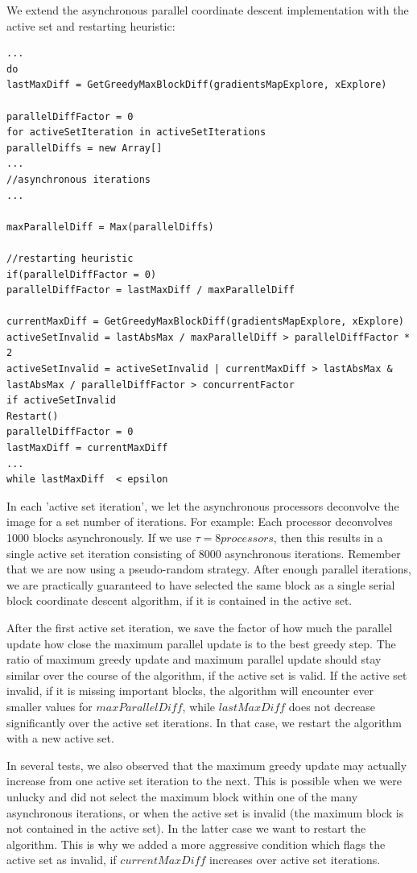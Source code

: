 We extend the asynchronous parallel coordinate descent implementation with the active set and restarting heuristic:
\begin{lstlisting}
...
do
lastMaxDiff = GetGreedyMaxBlockDiff(gradientsMapExplore, xExplore)

parallelDiffFactor = 0
for activeSetIteration in activeSetIterations
parallelDiffs = new Array[]
...
//asynchronous iterations
...

maxParallelDiff = Max(parallelDiffs)

//restarting heuristic
if(parallelDiffFactor = 0)
parallelDiffFactor = lastMaxDiff / maxParallelDiff

currentMaxDiff = GetGreedyMaxBlockDiff(gradientsMapExplore, xExplore)
activeSetInvalid = lastAbsMax / maxParallelDiff > parallelDiffFactor * 2
activeSetInvalid = activeSetInvalid | currentMaxDiff > lastAbsMax & lastAbsMax / parallelDiffFactor > concurrentFactor
if activeSetInvalid
Restart()
parallelDiffFactor = 0
lastMaxDiff = currentMaxDiff
...
while lastMaxDiff  < epsilon
\end{lstlisting}

In each 'active set iteration', we let the asynchronous processors deconvolve the image for a set number of iterations. For example: Each processor deconvolves 1000 blocks asynchronously. If we use $\tau = 8 processors$, then this results in a single active set iteration consisting of 8000 asynchronous iterations. Remember that we are now using a pseudo-random strategy. After enough parallel iterations, we are practically guaranteed to have selected the same block as a single serial block coordinate descent algorithm, if it is contained in the active set.

After the first active set iteration, we save the factor of how much the parallel update how close the maximum parallel update is to the best greedy step. The ratio of maximum greedy update and maximum parallel update should stay similar over the course of the algorithm, if the active set is valid. If the active set invalid, if it is missing important blocks, the algorithm will encounter ever smaller values for $maxParallelDiff$, while $lastMaxDiff$ does not decrease significantly over the active set iterations. In that case, we restart the algorithm with a new active set.

In several tests, we also observed that the maximum greedy update may actually increase from one active set iteration to the next. This is possible when we were unlucky and did not select the maximum block within one of the many asynchronous iterations, or when the active set is invalid (the maximum block is not contained in the active set). In the latter case we want to restart the algorithm. This is why we added a more aggressive condition which flags the active set as invalid, if $currentMaxDiff$ increases over active set iterations.



